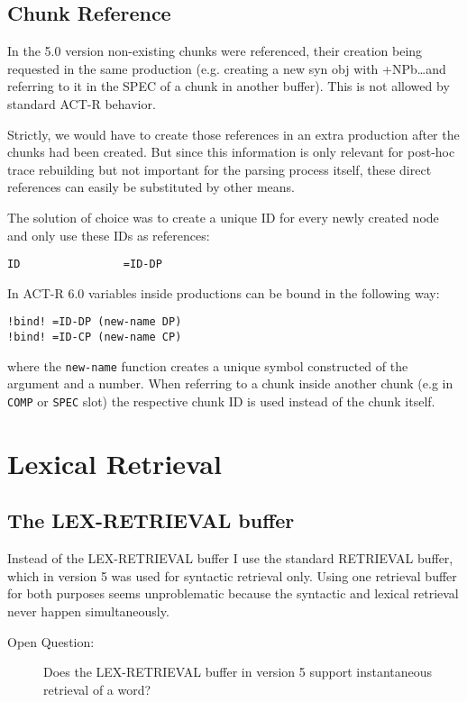 \documentclass[nobf,fignum,doc,longtable]{apa}
\begin{document}
\subsection{Chunk Reference}
In the 5.0 version non-existing chunks were referenced, their creation being requested in the same production (e.g. creating a new syn obj with +NPb\dots and referring to it in the SPEC of a chunk in another buffer). This is not allowed by standard ACT-R behavior. 

Strictly, we would have to create those references in an extra production after the chunks had been created. But since this information is only relevant for post-hoc trace rebuilding but not important for the parsing process itself, these direct references can easily be substituted by other means.

The solution of choice was to create a unique ID for every newly created node and only use these IDs as references: 
{\small \begin{verbatim}
ID                =ID-DP
\end{verbatim}}


In ACT-R 6.0 variables inside productions can be bound in the following way:

{\small \begin{verbatim}
!bind! =ID-DP (new-name DP)
!bind! =ID-CP (new-name CP)
\end{verbatim}}

where the \texttt{new-name} function creates a unique symbol constructed of the argument and a number. When referring to a chunk inside another chunk (e.g in \texttt{COMP} or \texttt{SPEC} slot) the respective chunk ID is used instead of the chunk itself.


\section{Lexical Retrieval}
\subsection{The LEX-RETRIEVAL buffer}
Instead of the LEX-RETRIEVAL buffer I use the standard RETRIEVAL buffer, which in version 5 was used for syntactic retrieval only. Using one retrieval buffer for both purposes seems unproblematic because the syntactic and lexical retrieval never happen simultaneously.

\begin{description}
\item[Open Question:]  Does the LEX-RETRIEVAL buffer in version 5 support instantaneous retrieval of a word?
\end{description}
\end{document}
